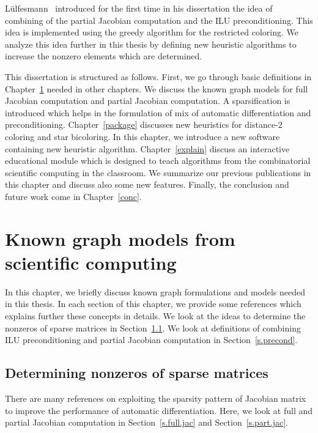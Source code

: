 \documentclass[12pt, twoside,a4paper,toc=bibliography]{scrbook}
\newcommand{\secref}[1]{Section~\protect\ref{#1}}
\newcommand{\chapref}[1]{Chapter~\protect\ref{#1}}
\begin{document}
Lülfesmann~\cite{Lulfesmann2012Fap} introduced for the first time in his dissertation
the idea of combining of the partial Jacobian computation and the ILU preconditioning. 
This idea is implemented using the greedy algorithm for the restricted coloring. 
We analyze this idea further in this thesis by defining new heuristic algorithms
to increase the nonzero elements which are determined.

This dissertation is structured as follows.
First, we go through basic definitions in \chapref{prel} needed in other chapters.
We discuss the known graph models for full Jacobian computation and partial Jacobian
computation. A sparsification is introduced which helps in the formulation of
mix of automatic differentiation and preconditioning.
\chapref{package} discusses new heuristics for distance-$2$ coloring and
star bicoloring.
In this chapter, we introduce a new software
containing new heuristic algorithm.
\chapref{explain} discuss an interactive educational module
which is designed to teach algorithms from the combinatorial scientific computing in the classroom.
We summarize our previous publications
\cite{2013:05,2014:01,2014:02,2014:09,2015:3} in this chapter and discuss also 
some new features.
Finally, the conclusion and future work come in \chapref{conc}.

\chapter{Known graph models from scientific computing}
\label{prel}
In this chapter, we briefly discuss known graph formulations and
models needed in this thesis. In each section of this chapter,
we provide some references which explains further these concepts in details.
We look at the ideas to determine the nonzeros of sparse matrices in
\secref{s.det.nonzero}.
We look at definitions of combining ILU preconditioning and 
partial Jacobian computation in \secref{s.precond}.

\section{Determining nonzeros of sparse matrices}
\label{s.det.nonzero}
There are many references on exploiting the sparsity pattern of Jacobian matrix
to improve the performance of automatic differentiation.
Here, we look at full and partial Jacobian computation in
\secref{s.full.jac} and \secref{s.part.jac}.
\end{document}
